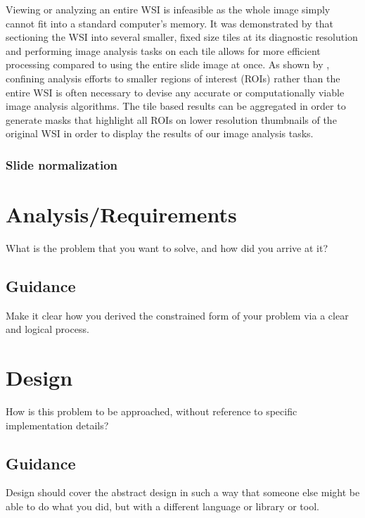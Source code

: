 \documentclass{l4proj}
\begin{document}
Viewing or analyzing an entire WSI is infeasible as the whole image simply cannot fit into a standard computer's memory. It was demonstrated by \cite{wang2012managing} that sectioning the WSI into several smaller, fixed size tiles at its diagnostic resolution and performing image analysis tasks on each tile allows for more efficient processing compared to using the entire slide image at once. As shown by \cite{aeffner2019introduction}, confining analysis efforts to smaller regions of interest (ROIs) rather than the entire WSI is often necessary to devise any accurate or computationally viable image analysis algorithms. The tile based results can be aggregated in order to generate masks that highlight all ROIs on lower resolution thumbnails of the original WSI in order to display the results of our image analysis tasks. 

\subsection{Slide normalization}

\chapter{Analysis/Requirements}
What is the problem that you want to solve, and how did you arrive at it?
\section{Guidance}
Make it clear how you derived the constrained form of your problem via a clear and logical process. 

\chapter{Design}
How is this problem to be approached, without reference to specific implementation details? 
\section{Guidance}
Design should cover the abstract design in such a way that someone else might be able to do what you did, but with a different language or library or tool.
\end{document}
